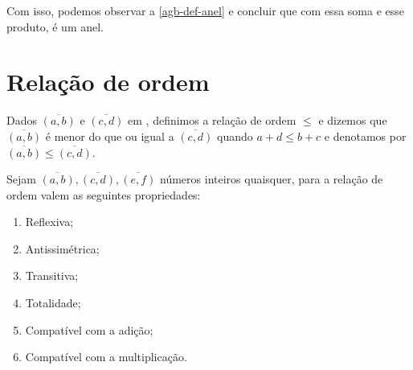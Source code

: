 \documentclass[../main.tex]{subfiles}
\begin{document}
Com isso, podemos observar a \cref{agb-def-anel} e concluir que \Z com essa soma e esse produto, é um anel.

\section{Relação de ordem}
\begin{defi}
    Dados $\overline{(a,b)}$ e $\overline{(c,d)}$ em \Z, definimos a relação de ordem $\leq$ e dizemos que $\overline{(a,b)}$ é menor do que ou igual a $\overline{(c,d)}$ quando $a+d \leq b+c$ e denotamos por $\overline{(a,b)} \leq \overline{(c,d)}$.
\end{defi}
\begin{prop}{Sejam $\overline{(a,b)}, \overline{(c,d)}, \overline{(e,f)}$ números inteiros quaisquer, para a relação de ordem valem as seguintes propriedades:}
    \begin{enumerate}[label=(\roman*)]
        \item Reflexiva;
        \item Antissimétrica;
        \item Transitiva;
        \item Totalidade;
        \item Compatível com a adição;
        \item Compatível com a multiplicação.
        
    \end{enumerate}
\end{prop}
\end{document}
